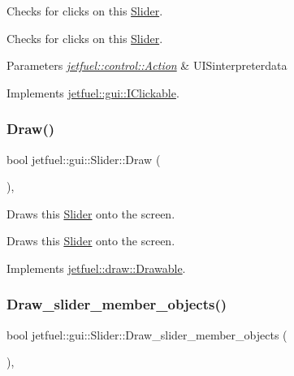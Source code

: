 Checks for clicks on this \hyperlink{classjetfuel_1_1gui_1_1Slider}{Slider}. 

Checks for clicks on this \hyperlink{classjetfuel_1_1gui_1_1Slider}{Slider}.


\begin{DoxyParams}{Parameters}
{\em \hyperlink{structjetfuel_1_1control_1_1Action}{jetfuel\+::control\+::\+Action}} & U\+I\+Sinterpreterdata \\
\hline
\end{DoxyParams}


Implements \hyperlink{classjetfuel_1_1gui_1_1IClickable_aea45de37bd3beb7eb7e2e3056e4e37b3}{jetfuel\+::gui\+::\+I\+Clickable}.

\mbox{\label{classjetfuel_1_1gui_1_1Slider_a483038c689276ed8468e990977e5a74a}} 
\subsubsection{\texorpdfstring{Draw()}{Draw()}}
{\footnotesize\ttfamily bool jetfuel\+::gui\+::\+Slider\+::\+Draw (\begin{DoxyParamCaption}{ }\end{DoxyParamCaption})\hspace{0.3cm}{\ttfamily [override]}, {\ttfamily [virtual]}}



Draws this \hyperlink{classjetfuel_1_1gui_1_1Slider}{Slider} onto the screen. 

Draws this \hyperlink{classjetfuel_1_1gui_1_1Slider}{Slider} onto the screen. 

Implements \hyperlink{classjetfuel_1_1draw_1_1Drawable_a1a072070322965ce9411ee6e7c311c56}{jetfuel\+::draw\+::\+Drawable}.

\mbox{\label{classjetfuel_1_1gui_1_1Slider_a730d18fe513120406907380b7caf3280}} 
\subsubsection{\texorpdfstring{Draw\+\_\+slider\+\_\+member\+\_\+objects()}{Draw\_slider\_member\_objects()}}
{\footnotesize\ttfamily bool jetfuel\+::gui\+::\+Slider\+::\+Draw\+\_\+slider\+\_\+member\+\_\+objects (\begin{DoxyParamCaption}{ }\end{DoxyParamCaption})\hspace{0.3cm}{\ttfamily [inline]}, {\ttfamily [protected]}}



